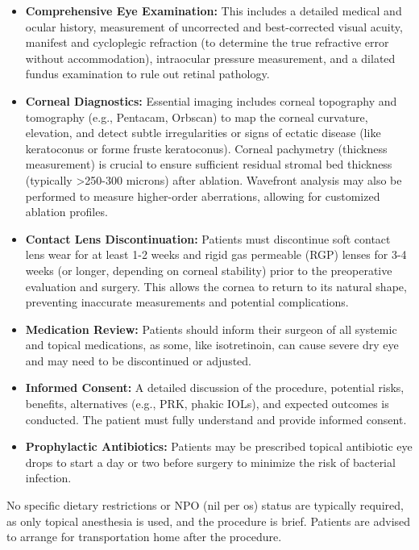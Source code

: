 \begin{itemize}
  \item \textbf{Comprehensive Eye Examination:} This includes a detailed medical and ocular history, measurement of uncorrected and best-corrected visual acuity, manifest and cycloplegic refraction (to determine the true refractive error without accommodation), intraocular pressure measurement, and a dilated fundus examination to rule out retinal pathology.
  
  \item \textbf{Corneal Diagnostics:} Essential imaging includes corneal topography and tomography (e.g., Pentacam, Orbscan) to map the corneal curvature, elevation, and detect subtle irregularities or signs of ectatic disease (like keratoconus or forme fruste keratoconus). Corneal pachymetry (thickness measurement) is crucial to ensure sufficient residual stromal bed thickness (typically >250-300 microns) after ablation. Wavefront analysis may also be performed to measure higher-order aberrations, allowing for customized ablation profiles.
  
  \item \textbf{Contact Lens Discontinuation:} Patients must discontinue soft contact lens wear for at least 1-2 weeks and rigid gas permeable (RGP) lenses for 3-4 weeks (or longer, depending on corneal stability) prior to the preoperative evaluation and surgery. This allows the cornea to return to its natural shape, preventing inaccurate measurements and potential complications.
  
  \item \textbf{Medication Review:} Patients should inform their surgeon of all systemic and topical medications, as some, like isotretinoin, can cause severe dry eye and may need to be discontinued or adjusted.
  
  \item \textbf{Informed Consent:} A detailed discussion of the procedure, potential risks, benefits, alternatives (e.g., PRK, phakic IOLs), and expected outcomes is conducted. The patient must fully understand and provide informed consent.
  
  \item \textbf{Prophylactic Antibiotics:} Patients may be prescribed topical antibiotic eye drops to start a day or two before surgery to minimize the risk of bacterial infection.
\end{itemize}

No specific dietary restrictions or NPO (nil per os) status are typically required, as only topical anesthesia is used, and the procedure is brief. Patients are advised to arrange for transportation home after the procedure.

